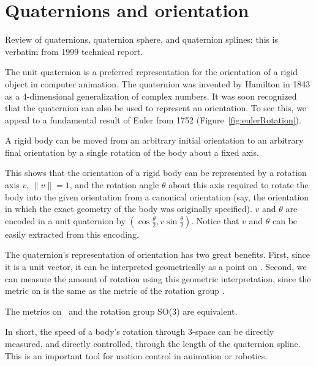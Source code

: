 \documentclass[11pt]{article}
\begin{document}
\clearpage

\section{Quaternions and orientation}
\label{sec:quaternion}

Review of quaternions, quaternion sphere, and quaternion splines:
this is verbatim from 1999 technical report.

The unit quaternion is a preferred representation for the
orientation of a rigid object in computer animation.
The quaternion was invented by Hamilton in 1843
as a 4-dimensional generalization of complex numbers.
It was soon recognized that the quaternion can also be used
to represent an orientation.
To see this, we appeal to a fundamental result of Euler from 1752
\cite{goldstein50} (Figure~\ref{fig:eulerRotation}).	
\begin{theorem}[Euler]
A rigid body can be moved from an arbitrary initial orientation
to an arbitrary final orientation by a single rotation of the body
about a fixed axis.
\end{theorem}
%
%
This shows that the orientation of a rigid body can be represented by 
a rotation axis $v$, $\|v\|=1$, and the rotation angle $\theta$ about 
this axis required to rotate the body into the given orientation from a
canonical orientation (say, the orientation in which the exact geometry
of the body was originally specified).
$v$ and $\theta$ are encoded in a unit quaternion by
$(\cos \frac{\theta}{2}, v \sin \frac{\theta}{2})$.
Notice that $v$ and $\theta$ can be easily extracted from this encoding.

The quaternion's representation of orientation has two great benefits.
First, since it is a unit vector, it can be interpreted geometrically
as a point on .
Second, we can measure the amount of rotation using this geometric
interpretation, since the metric on 
is the same as the metric of the rotation group \cite{misner73}.
%
\begin{theorem}
\label{thm:metric}
The metrics on \ and the rotation group SO(3) are equivalent.
\end{theorem}
%
In short, the speed of a body's rotation through 3-space
can be directly measured,
and directly controlled, through the length of the quaternion spline.
This is an important tool for motion control in animation or robotics.
\end{document}

